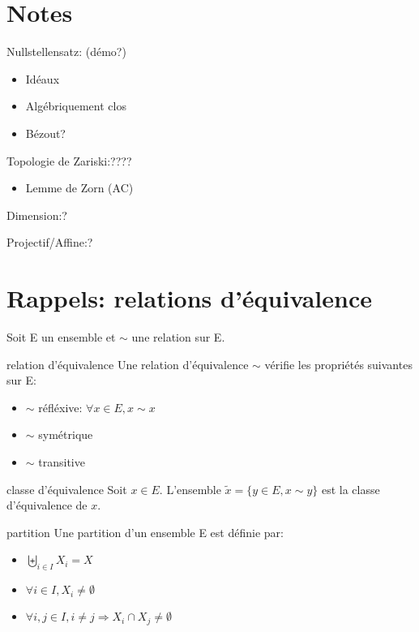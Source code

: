 \section{Notes}

Nullstellensatz: (démo?)
\begin{itemize}
    \item Idéaux
    \item Algébriquement clos
    \item Bézout?
\end{itemize}
\mbox{}

Topologie de Zariski:????
\begin{itemize}
    \item Lemme de Zorn (AC)
\end{itemize}
\mbox{}

Dimension:?
\mbox{}

Projectif/Affine:?
\mbox{}




\section{Rappels: relations d'équivalence}

Soit E un ensemble et $\sim$ une relation sur E.

\begin{definition}{relation d'équivalence}{}
    Une relation d'équivalence $\sim$ vérifie les propriétés suivantes sur E:
    \begin{itemize}
        \item $\sim$ réfléxive: $\forall x \in E, x \sim x$
        \item $\sim$ symétrique
        \item $\sim$ transitive
    \end{itemize}
\end{definition}

\begin{definition}{classe d'équivalence}{}
    Soit $x \in E$.
    L'ensemble $\tilde{x} = \{y \in E, x \sim y\}$ est la classe d'équivalence de $x$.
\end{definition}

\begin{definition}{partition}{}
    Une partition d'un ensemble E est définie par:
    \begin{itemize}
        \item $\biguplus_{i \in I} X_{i} = X$
        \item $\forall i \in I, X_{i} \neq \emptyset$
        \item $\forall i,j \in I, i \neq j \Rightarrow X_{i} \cap X_{j} \neq \emptyset$
    \end{itemize}
\end{definition}

